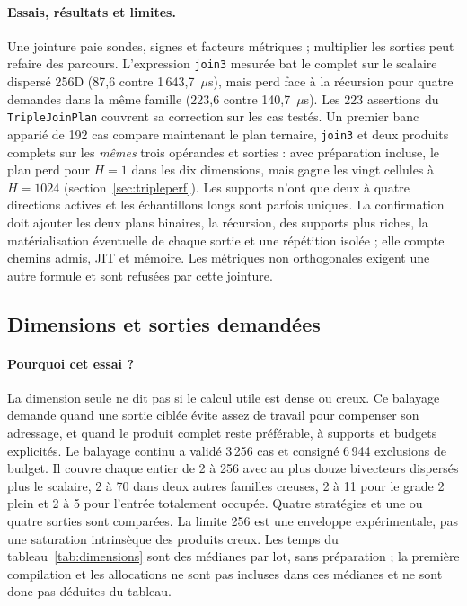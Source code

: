 \documentclass[11pt,a4paper]{article}
\newcommand{\code}[1]{\texttt{#1}}
\begin{document}
\paragraph{Essais, résultats et limites.}
Une jointure paie sondes, signes et facteurs métriques ; multiplier les sorties
peut refaire des parcours. L'expression \code{join3} mesurée bat le complet
sur le scalaire dispersé 256D (87,6 contre 1\,643,7~\(\mu\)s), mais perd
face à la récursion pour quatre demandes dans la même famille
(223,6 contre 140,7~\(\mu\)s). Les 223 assertions du
\code{TripleJoinPlan} couvrent sa correction sur les cas testés. Un premier
banc apparié de 192 cas compare maintenant le plan ternaire, \code{join3}
et deux produits complets sur les \emph{mêmes} trois opérandes et sorties :
avec préparation incluse, le plan perd pour $H=1$ dans les dix dimensions,
mais gagne les vingt cellules à $H=1024$
(section~\ref{sec:tripleperf}). Les supports n'ont que deux à quatre
directions actives et les échantillons longs sont parfois uniques.
La confirmation doit ajouter les deux plans binaires, la récursion, des
supports plus riches, la matérialisation éventuelle de chaque sortie et
une répétition isolée ; elle compte chemins admis, JIT et mémoire.
Les métriques non orthogonales exigent une autre formule et sont refusées
par cette jointure.

\subsection{Dimensions et sorties demandées}
\paragraph{Pourquoi cet essai ?}
La dimension seule ne dit pas si le calcul utile est dense ou creux.
Ce balayage demande quand une sortie ciblée évite assez de travail
pour compenser son adressage, et quand le produit complet reste préférable,
à supports et budgets explicités.
Le balayage continu a validé 3\,256 cas et consigné 6\,944 exclusions de budget.
Il couvre chaque entier de 2 à 256 avec au plus douze bivecteurs dispersés
plus le scalaire, 2 à 70 dans deux autres familles creuses, 2 à 11 pour le grade
2 plein et 2 à 5 pour l'entrée totalement occupée. Quatre stratégies et une ou
quatre sorties sont comparées. La limite 256 est une enveloppe expérimentale,
pas une saturation intrinsèque des produits creux. Les temps du
tableau~\ref{tab:dimensions} sont des médianes par lot, sans préparation ; la
première compilation et les allocations ne sont pas incluses dans ces
médianes et ne sont donc pas déduites du tableau.
\end{document}

